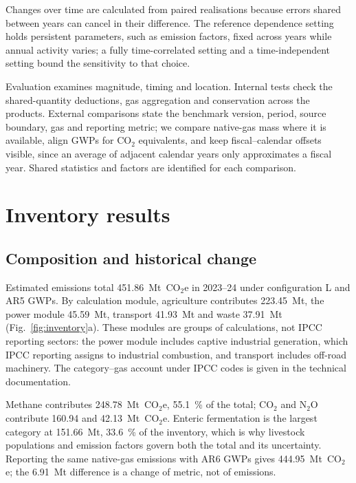 \documentclass[essd,manuscript]{copernicus}
\begin{document}
Changes over time are calculated from paired realisations because errors shared between years can cancel in their difference. The reference dependence setting holds persistent parameters, such as emission factors, fixed across years while annual activity varies; a fully time-correlated setting and a time-independent setting bound the sensitivity to that choice.

Evaluation examines magnitude, timing and location. Internal tests check the shared-quantity deductions, gas aggregation and conservation across the products. External comparisons state the benchmark version, period, source boundary, gas and reporting metric; we compare native-gas mass where it is available, align GWPs for CO$_2$ equivalents, and keep fiscal--calendar offsets visible, since an average of adjacent calendar years only approximates a fiscal year. Shared statistics and factors are identified for each comparison.

\section{Inventory results}
\label{sec:results}

\subsection{Composition and historical change}
\label{sec:composition}

Estimated emissions total \SI{451.86}{\mega\tonne}~CO$_2$e in 2023--24 under configuration L and AR5 GWPs. By calculation module, agriculture contributes \SI{223.45}{\mega\tonne}, the power module \SI{45.59}{\mega\tonne}, transport \SI{41.93}{\mega\tonne} and waste \SI{37.91}{\mega\tonne} (Fig.~\ref{fig:inventory}a). These modules are groups of calculations, not IPCC reporting sectors: the power module includes captive industrial generation, which IPCC reporting assigns to industrial combustion, and transport includes off-road machinery. The category--gas account under IPCC codes is given in the technical documentation.

Methane contributes \SI{248.78}{\mega\tonne}~CO$_2$e, \SI{55.1}{\percent} of the total; CO$_2$ and N$_2$O contribute \SI{160.94}{} and \SI{42.13}{\mega\tonne}~CO$_2$e. Enteric fermentation is the largest category at \SI{151.66}{\mega\tonne}, \SI{33.6}{\percent} of the inventory, which is why livestock populations and emission factors govern both the total and its uncertainty. Reporting the same native-gas emissions with AR6 GWPs gives \SI{444.95}{\mega\tonne}~CO$_2$e; the \SI{6.91}{\mega\tonne} difference is a change of metric, not of emissions.
\end{document}

